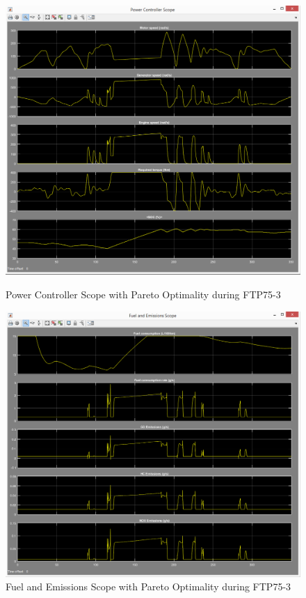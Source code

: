 \begin{figure}[hp]
\centering
\includegraphics[scale=0.4]{figures/Pareto/FTP75-3/powerController08Juni}
\caption{Power Controller Scope with Pareto Optimality during FTP75-3}
\label{fig:pcpo3}
\includegraphics[scale=0.4]{figures/Pareto/FTP75-3/fuelEmissions08Juni}
\caption{Fuel and Emissions Scope with Pareto Optimality during FTP75-3}
\label{fig:fepo3}
\end{figure}

